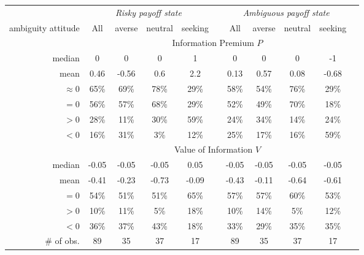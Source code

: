 \begin{tabular}{ r c c c c c c c c c c }
\toprule 
& \multicolumn{4}{c}{\it Risky payoff state} & & \multicolumn{4}{c}{\it Ambiguous payoff state}\\
\cmidrule[\mrw](lr){2-5} \cmidrule[\mrw](lr){7-10}
ambiguity attitude & \multicolumn{1}{c}{All} & \multicolumn{1}{c}{averse} & \multicolumn{1}{c}{neutral} & \multicolumn{1}{c}{seeking} & & \multicolumn{1}{c}{All} & \multicolumn{1}{c}{averse} & \multicolumn{1}{c}{neutral} & \multicolumn{1}{c}{seeking}\\
\midrule[\mrw] 
& \multicolumn{9}{c}{Information Premium $P$}\\ 
\midrule[\mrw] 
median & 0 & 0 & 0 & 1 &  & 0 & 0 & 0 & -1 \\
mean & 0.46 & -0.56 & 0.6 & 2.2 &  & 0.13 & 0.57 & 0.08 & -0.68 \\
$\approx 0$ & 65\% & 69\% & 78\% & 29\% &  & 58\% & 54\% & 76\% & 29\% \\
$=0$ & 56\% & 57\% & 68\% & 29\% &  & 52\% & 49\% & 70\% & 18\% \\
$>0$ & 28\% & 11\% & 30\% & 59\% &  & 24\% & 34\% & 14\% & 24\% \\
$<0$ & 16\% & 31\% & 3\% & 12\% &  & 25\% & 17\% & 16\% & 59\% \\
\midrule[\mrw] 
& \multicolumn{9}{c}{Value of Information $V$}\\ 
\midrule[\mrw] 
median & -0.05 & -0.05 & -0.05 & 0.05 &  & -0.05 & -0.05 & -0.05 & -0.05 \\
mean & -0.41 & -0.23 & -0.73 & -0.09 &  & -0.43 & -0.11 & -0.64 & -0.61 \\
$=0$ & 54\% & 51\% & 51\% & 65\% &  & 57\% & 57\% & 60\% & 53\% \\
$>0$ & 10\% & 11\% & 5\% & 18\% &  & 10\% & 14\% & 5\% & 12\% \\
$<0$ & 36\% & 37\% & 43\% & 18\% &  & 33\% & 29\% & 35\% & 35\% \\
\midrule[\mrw] 
\# of obs. & 89 & 35 & 37 & 17 &  & 89 & 35 & 37 & 17 \\
\bottomrule 
 \end{tabular}